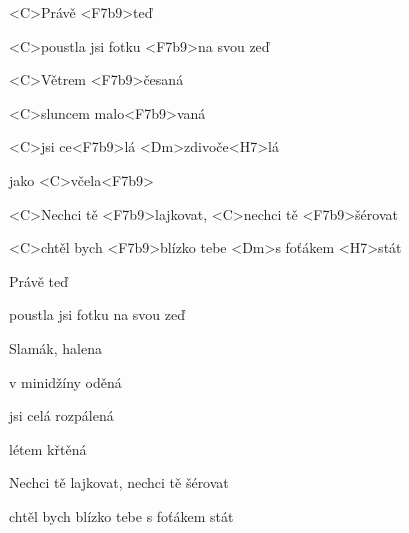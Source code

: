 

\zs
<C>Právě <F7b9>teď

<C>poustla jsi fotku <F7b9>na svou zeď

<C>Větrem <F7b9>česaná

<C>sluncem malo<F7b9>vaná

<C>jsi ce<F7b9>lá <Dm>zdivoče<H7>lá

jako <C>včela<F7b9>
\ks

\zr
<C>Nechci tě <F7b9>lajkovat, <C>nechci tě <F7b9>šérovat

<C>chtěl bych <F7b9>blízko tebe <Dm>s foťákem <H7>stát
\kr

\zs
Právě teď

poustla jsi fotku na svou zeď

Slamák, halena

v minidžíny oděná

jsi celá rozpálená

létem křtěná
\ks

\zr
Nechci tě lajkovat, nechci tě šérovat

chtěl bych blízko tebe s foťákem stát
\kr

\kp

